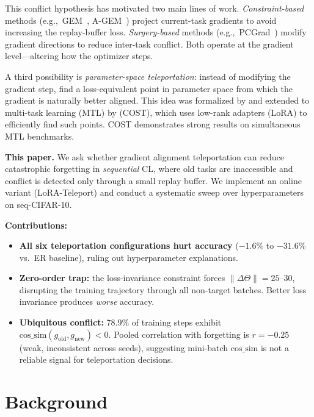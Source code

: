\documentclass[11pt,a4paper]{article}
\newcommand{\method}{LoRA-Teleport}
\newcommand{\eg}{e.g.,~}
\newcommand{\cossim}{\mathrm{cos\_sim}}
\begin{document}
This conflict hypothesis has motivated two main lines of work.
\emph{Constraint-based} methods (\eg GEM~\citep{lopezpaz2017gem}, A-GEM~\citep{chaudhry2019agem})
project current-task gradients to avoid increasing the replay-buffer loss.
\emph{Surgery-based} methods (\eg PCGrad~\citep{yu2020pcgrad}) modify gradient directions
to reduce inter-task conflict.
Both operate at the gradient level---altering how the optimizer steps.

A third possibility is \emph{parameter-space teleportation}: instead of modifying the gradient step,
find a loss-equivalent point in parameter space from which the gradient is naturally better aligned.
This idea was formalized by \citet{zhao2022teleport} and extended to multi-task learning (MTL) by
\citet{zhou2025cost} (COST), which uses low-rank adapters (LoRA) to efficiently find such points.
COST demonstrates strong results on simultaneous MTL benchmarks.

\textbf{This paper.}
We ask whether gradient alignment teleportation can reduce catastrophic forgetting in
\emph{sequential} CL, where old tasks are inaccessible and conflict is detected only
through a small replay buffer.
We implement an online variant (\method) and conduct a systematic sweep over
hyperparameters on seq-CIFAR-10.

\textbf{Contributions:}
\begin{itemize}
  \item \textbf{All six teleportation configurations hurt accuracy}
        ($-1.6\%$ to $-31.6\%$ vs.~ER baseline), ruling out hyperparameter explanations.
  \item \textbf{Zero-order trap:} the loss-invariance constraint forces
        $\|\Delta\Theta\| = 25$--$30$, disrupting the training trajectory through all
        non-target batches. Better loss invariance produces \emph{worse} accuracy.
  \item \textbf{Ubiquitous conflict:} 78.9\% of training steps exhibit
        $\cossim(g_\mathrm{old}, g_\mathrm{new}) < 0$.
        Pooled correlation with forgetting is $r = -0.25$ (weak, inconsistent across seeds),
        suggesting mini-batch $\cossim$ is not a reliable signal for teleportation decisions.
\end{itemize}

\section{Background}
\label{sec:background}
\end{document}

